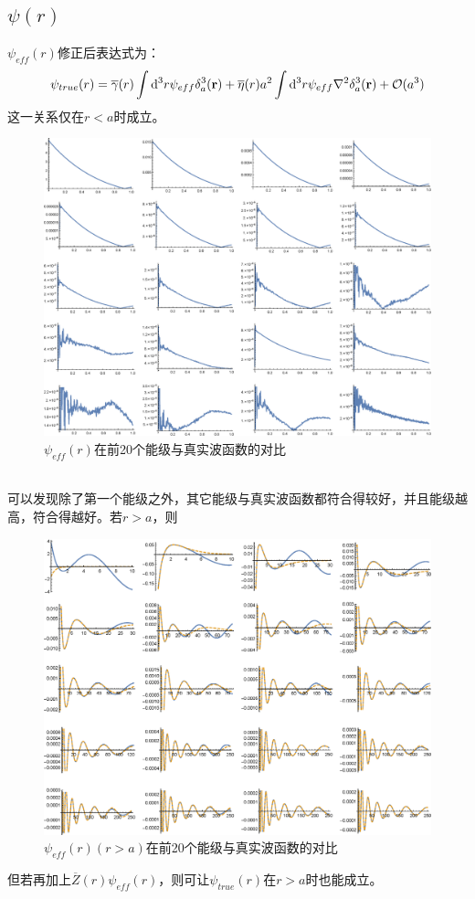 \documentclass[hyperref,cs4size,titlepage,twoside]{ctexart}
\begin{document}
\subsection{$\psi(r)$}
$\psi_{eff}(r)$修正后表达式为：
\begin{equation}\label{psi0r}
  \psi_{true}(r)=\overline{\gamma}(r)\int\dd^3r\psi_{eff}\delta^3_a(\vb{r})+\overline{\eta}(r)a^2\int\dd^3r\psi_{eff}\laplacian{\delta^3_a(\vb{r})}+\mathcal{O}(a^3)
\end{equation}
这一关系仅在$r<a$时成立。
\begin{figure}[!htbp]
  \centering
  \includegraphics[width=6in]{psir.eps}
  \caption{$\psi_{eff}(r)$在前20个能级与真实波函数的对比}
\end{figure}\\
可以发现除了第一个能级之外，其它能级与真实波函数都符合得较好，并且能级越高，符合得越好。若$r>a$，则
\clearpage
\begin{figure}[!htbp]
  \centering
  \includegraphics[width=6in]{psir_2.eps}
  \caption{$\psi_{eff}(r)(r>a)$在前20个能级与真实波函数的对比}
\end{figure}
但若再加上$\overline{Z}(r)\psi_{eff}(r)$，则可让$\psi_{true}(r)$在$r>a$时也能成立。
\end{document}
